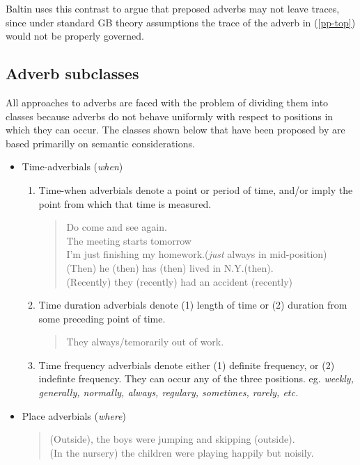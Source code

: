 Baltin uses this contrast to argue that preposed adverbs may not leave
traces, since under standard GB theory assumptions the trace of the
adverb in (\ref{pp-top}) would not be properly governed. 

\subsection{Adverb subclasses}
All approaches to adverbs are faced with the problem of dividing them
into classes because adverbs do not behave uniformly with respect to
positions in which they can occur. The classes shown below that have
been proposed by  \cite{Quirk}   are based primarilly on
semantic considerations. 

\begin{itemize}
 \item Time-adverbials ({\em when})
  \begin{enumerate}
   \item Time-when adverbials denote a point or period of time, and/or
imply the point from which that time is measured.
     \begin{verse}
      Do come and see again.\\
      The meeting starts tomorrow \\
      I'm just finishing my homework.({\em just\/} always in mid-position)\\
      (Then) he (then) has (then) lived in N.Y.(then).\\
      (Recently) they (recently) had an accident (recently)
     \end{verse}
   \item Time duration adverbials denote (1) length of time or (2) duration
         from some preceding point of time. 
     \begin{verse}
      They always/temorarily out of work.
     \end{verse}
   \item Time frequency adverbials denote either (1) definite
         frequency, or (2) indefinte frequency. They can occur any of
         the three positions. eg. {\em weekly, generally, normally,
         always, regulary, sometimes, rarely, etc.}
  \end{enumerate}
 \item Place adverbials ({\em where\/})
     \begin{verse}
      (Outside), the boys were jumping and skipping (outside).\\
      (In the nursery) the children were playing happily but noisily.\\

\end{verse}
\end{itemize}
